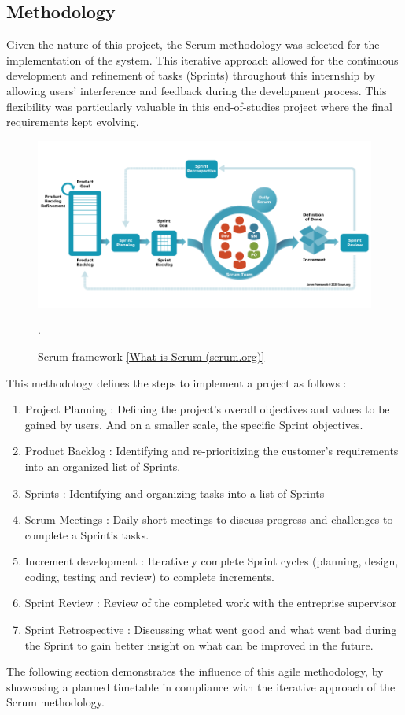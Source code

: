 \subsection{Methodology}
Given the nature of this project, the Scrum methodology was selected for the implementation of the system. This iterative approach allowed for the continuous development and refinement of tasks (Sprints) throughout this internship by allowing users' interference and feedback during the development process. This flexibility was particularly valuable in this end-of-studies project where the final requirements kept evolving.
\begin{figure}[H]
    \centering
    \includegraphics[width=\linewidth]{./figures/scrum-framework-9.29.23.png}
    \caption{Scrum framework \href{https://www.scrum.org/resources/what-scrum-module}{[What is Scrum (scrum.org)]}}.
\end{figure}
This methodology defines the steps to implement a project as follows :
\begin{enumerate}
    \item Project Planning : Defining the project's overall objectives and values to be gained by users. And on a smaller scale, the specific Sprint objectives.
    \item Product Backlog : Identifying and re-prioritizing the customer's requirements into an organized list of Sprints.
    \item Sprints : Identifying and organizing tasks into a list of Sprints
    \item Scrum Meetings : Daily short meetings to discuss progress and challenges to complete a Sprint's tasks.
    \item Increment development : Iteratively complete Sprint cycles (planning, design, coding, testing and review) to complete increments.
    \item Sprint Review : Review of the completed work with the entreprise supervisor
    \item Sprint Retrospective : Discussing what went good and what went bad during the Sprint to gain better insight on what can be improved in the future.
\end{enumerate}
The following section demonstrates the influence of this agile methodology, by showcasing a planned timetable in compliance with the iterative approach of the Scrum methodology.
